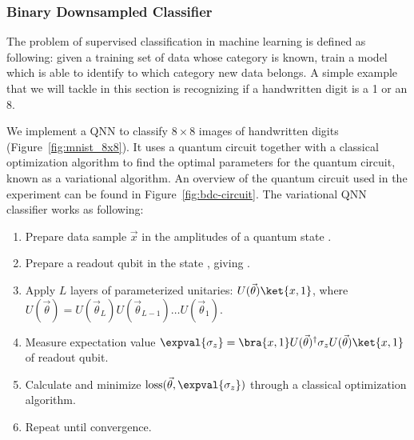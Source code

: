 \documentclass[a4paper,10pt]{article}
\DeclareMathOperator{\loss}{loss}
\begin{document}
\subsubsection{Binary Downsampled Classifier} \label{sec:bdc}
The problem of supervised classification in machine learning is defined as following: given a training set of data whose category is known, train a model which is able to identify to which category new data belongs.
A simple example that we will tackle in this section is recognizing if a handwritten digit is a 1 or an 8.

We implement a QNN to classify $8 \times 8$ images of handwritten digits (Figure~\ref{fig:mnist_8x8}).
It uses a quantum circuit together with a classical optimization algorithm to find the optimal parameters for the quantum circuit, known as a variational algorithm.
An overview of the quantum circuit used in the experiment can be found in Figure~\ref{fig:bdc-circuit}.
The variational QNN classifier works as following:
\begin{enumerate}
	\item Prepare data sample $\vec{x}$ in the amplitudes of a quantum state .
	\item Prepare a readout qubit in the state , giving .
	\item Apply $L$ layers of parameterized unitaries: $U(\vec{\theta})\ket{x, 1}$, where $U(\vec{\theta}) = U(\vec{\theta}_L) U(\vec{\theta}_{L-1}) \ldots U(\vec{\theta}_1)$.
	\item Measure expectation value $\expval{\sigma_z} = \bra{x, 1}U(\vec{\theta})^\dagger \sigma_z U(\vec{\theta})\ket{x, 1}$ of readout qubit.
	\item Calculate and minimize $\loss(\vec{\theta}, \expval{\sigma_z})$ through a classical optimization algorithm.
	\item Repeat until convergence.
\end{enumerate}
\end{document}
